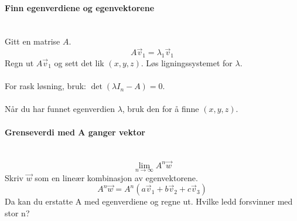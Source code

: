 \paragraph{Finn egenverdiene og egenvektorene} \mbox{} \\
Gitt en matrise $A$.
$$A\vec{v}_1 = \lambda_1 \vec{v}_1$$
Regn ut $A\vec{v}_1$ og sett det lik $(x,y,z)$.
Løs ligningssystemet for $\lambda$.
\\\\
For rask løsning, bruk: $\det{(\lambda I_n - A)} = 0$.
\\\\
Når du har funnet egenverdien $\lambda$, bruk den for å finne $(x,y,z)$.



\paragraph{Grenseverdi med A ganger vektor} \mbox{} \\
$$\lim_{n \to \infty} A^n \vec{w}$$
Skriv $\vec{w}$ som en lineær kombinasjon av egenvektorene.
$$A^n \vec{w} = A^n (a\vec{v}_1 + b\vec{v}_2 + c\vec{v}_3)$$
Da kan du erstatte A med egenverdiene og regne ut.
Hvilke ledd forsvinner med stor n?
